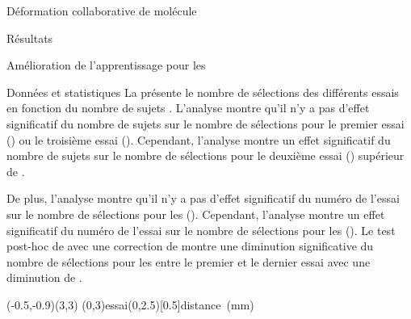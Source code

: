 \documentclass[myfrancais,ngerman,english,frenchb]{mythesis}
\begin{document}
\begin{mychapter}{Déformation collaborative de molécule}
\begin{mysection}{Résultats}
\begin{mysubsection}{Amélioration de l'apprentissage pour les }
\begin{mysubsubsection}{Données et statistiques}
					La  présente le nombre de sélections  des différents essais  en fonction du nombre de sujets .
					L'analyse montre qu'il n'y a pas d'effet significatif du nombre de sujets  sur le nombre de sélections  pour le premier essai () ou le troisième essai ().
					Cependant, l'analyse montre un effet significatif du nombre de sujets  sur le nombre de sélections  pour le deuxième essai () supérieur de .

					De plus, l'analyse montre qu'il n'y a pas d'effet significatif du numéro de l'essai  sur le nombre de sélections  pour les  ().
					Cependant, l'analyse montre un effet significatif du numéro de l'essai  sur le nombre de sélections  pour les  ().
					Le test post-hoc de  avec une correction de  montre une diminution significative du nombre de sélections pour les  entre le premier et le dernier essai avec une diminution de .

					\begin{myfigure}
						\begin{myps}(-0.5,-0.9)(3,3)
							\myaxes(0,3){essai}(0,2.5)[0.5]{distance~(mm)}
						\end{myps}
					\end{myfigure}


\end{mysubsubsection}
\end{mysubsection}
\end{mysection}
\end{mychapter}
\end{document}
